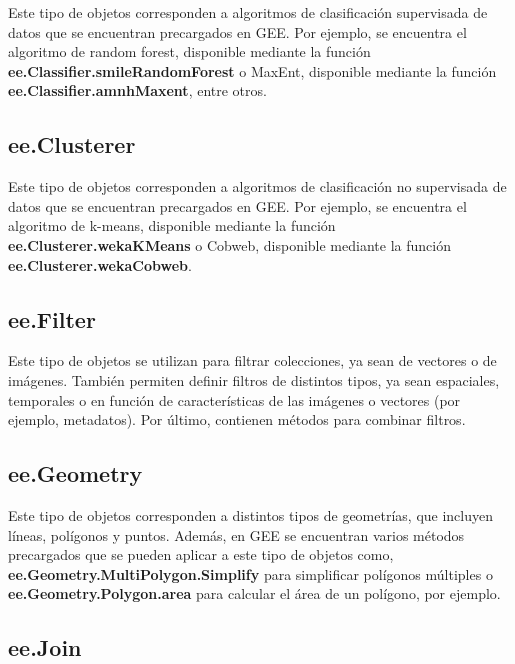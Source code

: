 \documentclass[
  12pt,
  letterpaper,
  twoside]{book}
\newcommand\boldpurple[1]{\textcolor{darkpurple}{\textbf{#1}}}
\begin{document}
Este tipo de objetos corresponden a algoritmos de clasificación supervisada de datos que se encuentran precargados en GEE. Por ejemplo, se encuentra el algoritmo de random forest, disponible mediante la función \boldpurple{ee.Classifier.smileRandomForest} o MaxEnt, disponible mediante la función \boldpurple{ee.Classifier.amnhMaxent}, entre otros.

\hypertarget{ee.clusterer}{%
\subsection*{ee.Clusterer}\label{ee.clusterer}}

Este tipo de objetos corresponden a algoritmos de clasificación no supervisada de datos que se encuentran precargados en GEE. Por ejemplo, se encuentra el algoritmo de k-means, disponible mediante la función \boldpurple{ee.Clusterer.wekaKMeans} o Cobweb, disponible mediante la función \boldpurple{ee.Clusterer.wekaCobweb}.

\hypertarget{ee.filter}{%
\subsection*{ee.Filter}\label{ee.filter}}

Este tipo de objetos se utilizan para filtrar colecciones, ya sean de vectores o de imágenes. También permiten definir filtros de distintos tipos, ya sean espaciales, temporales o en función de características de las imágenes o vectores (por ejemplo, metadatos). Por último, contienen métodos para combinar filtros.

\hypertarget{ee.geometry}{%
\subsection*{ee.Geometry}\label{ee.geometry}}

Este tipo de objetos corresponden a distintos tipos de geometrías, que incluyen líneas, polígonos y puntos. Además, en GEE se encuentran varios métodos precargados que se pueden aplicar a este tipo de objetos como, \boldpurple{ee.Geometry.MultiPolygon.Simplify} para simplificar polígonos múltiples o \boldpurple{ee.Geometry.Polygon.area} para calcular el área de un polígono, por ejemplo.

\hypertarget{ee.join}{%
\subsection*{ee.Join}\label{ee.join}}
\end{document}
